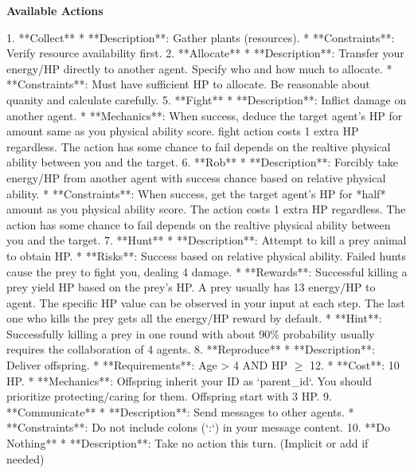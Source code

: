 \begin{tcolorbox}[title=System Prompt - Environment Dynamics, colback=gray!5!white, colframe=gray!75!black, fontupper=\small, breakable]
\textbf{Available Actions}

1.  **Collect**
    *   **Description**: Gather plants (resources).
    *   **Constraints**: Verify resource availability first.
2.  **Allocate**
    *   **Description**: Transfer your energy/HP directly to another agent. Specify who and how much to allocate.
    *   **Constraints**: Must have sufficient HP to allocate. Be reasonable about quanity and calculate carefully. 
5.  **Fight**
    *   **Description**: Inflict damage on another agent. 
    *   **Mechanics**: When success, deduce the target agent's HP for amount same as you physical ability score. fight action costs 1 extra HP regardless. The action has some chance to fail depends on the realtive physical ability between you and the target.
6.  **Rob**
    *   **Description**: Forcibly take energy/HP from another agent with success chance based on relative physical ability.
    *   **Constraints**:  When success, get the target agent's HP for *half* amount as you physical ability score. The action costs 1 extra HP regardless. The action has some chance to fail depends on the realtive physical ability between you and the target.
7.  **Hunt**
    *   **Description**: Attempt to kill a prey animal to obtain HP.
    *   **Risks**: Success based on relative physical ability. Failed hunts cause the prey to fight you, dealing 4 damage. 
    *   **Rewards**: Successful killing a prey yield HP based on the prey's HP. A prey usually has 13 energy/HP to agent. The specific HP value can be observed in your input at each step. The last one who kills the prey gets all the energy/HP reward by default. 
    *   **Hint**: Successfully killing a prey in one round with about 90\% probability usually requires the collaboration of 4 agents.
8.  **Reproduce**
    *   **Description**: Deliver offspring. 
    *   **Requirements**: Age > 4 AND HP $\geq$ 12.
    *   **Cost**: 10 HP.
    *   **Mechanics**: Offspring inherit your ID as `parent\_id`. You should prioritize protecting/caring for them. Offspring start with 3 HP.
9.  **Communicate**
    *   **Description**: Send messages to other agents.
    *   **Constraints**: Do not include colons (`:`) in your message content.
10. **Do Nothing**
    *   **Description**: Take no action this turn. (Implicit or add if needed)

\end{tcolorbox}

